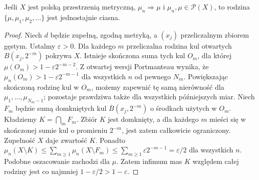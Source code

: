 \begin{lemat}
\label{lem:weak-sequence-tight-22}
Jeśli $X$ jest polską przestrzenią metryczną,
$\mu_n\Rightarrow\mu$ i $\mu_n,\mu\in\mathcal P(X)$,
to rodzina $\{\mu,\mu_1,\mu_2,\ldots\}$ jest
jednostajnie ciasna.
\end{lemat}
\begin{proof}
Niech $d$ będzie zupełną, zgodną metryką, a $(x_j)$
przeliczalnym zbiorem gęstym. Ustalmy $\varepsilon>0$.
Dla każdego $m$ przeliczalna rodzina kul otwartych
$B(x_j,2^{-m})$ pokrywa $X$. Istnieje skończona
suma tych kul $O_m$, dla której
$\mu(O_m)>1-\varepsilon2^{-m-2}$.
Z otwartej wersji Portmanteau wynika, że
$\mu_n(O_m)>1-\varepsilon2^{-m-1}$ dla wszystkich
$n$ od pewnego $N_m$.
Powiększając skończoną rodzinę kul w $O_m$,
możemy zapewnić tę samą nierówność dla
$\mu_1,\ldots,\mu_{N_m-1}$; pozostaje prawdziwa
także dla wszystkich późniejszych miar.
Niech $F_m$ będzie sumą domkniętych kul
$\overline B(x_j,2^{-m})$ o środkach użytych w $O_m$.
Kładziemy $K=\bigcap_mF_m$. Zbiór $K$ jest domknięty,
a dla każdego $m$ mieści się w skończonej sumie kul
o promieniu $2^{-m}$, jest zatem całkowicie ograniczony.
Zupełność $X$ daje zwartość $K$. Ponadto
$\mu_n(X\setminus K)\le\sum_{m\ge1}\mu_n(X\setminus F_m)
\le\sum_{m\ge1}\varepsilon2^{-m-1}=\varepsilon/2$
dla wszystkich $n$. Podobne oszacowanie zachodzi dla $\mu$.
Zatem infimum mas $K$ względem całej rodziny jest
co najmniej $1-\varepsilon/2>1-\varepsilon$.
\end{proof}

